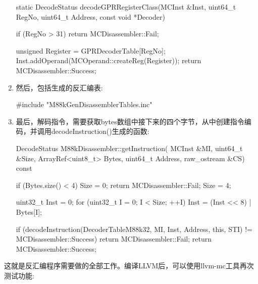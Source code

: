 \begin{enumerate}
\begin{cpp}
static DecodeStatus
decodeGPRRegisterClass(MCInst &Inst, uint64_t RegNo,
                        uint64_t Address,
                        const void *Decoder) {
    if (RegNo > 31)
        return MCDisassembler::Fail;

    unsigned Register = GPRDecoderTable[RegNo];
    Inst.addOperand(MCOperand::createReg(Register));
    return MCDisassembler::Success;
}
\end{cpp}

\item
然后，包括生成的反汇编表:

\begin{cpp}
#include "M88kGenDisassemblerTables.inc"
\end{cpp}

\item
最后，解码指令，需要获取bytes数组中接下来的四个字节，从中创建指令编码，并调用decodeInstruction()生成的函数:

\begin{cpp}
DecodeStatus M88kDisassembler::getInstruction(
        MCInst &MI, uint64_t &Size, ArrayRef<uint8_t> Bytes,
        uint64_t Address, raw_ostream &CS) const {
    if (Bytes.size() < 4) {
        Size = 0;
        return MCDisassembler::Fail;
    }
    Size = 4;

    uint32_t Inst = 0;
    for (uint32_t I = 0; I < Size; ++I)
        Inst = (Inst << 8) | Bytes[I];

    if (decodeInstruction(DecoderTableM88k32, MI, Inst,
                          Address, this, STI) !=
        MCDisassembler::Success) {
        return MCDisassembler::Fail;
    }
    return MCDisassembler::Success;
}
\end{cpp}

\end{enumerate}

这就是反汇编程序需要做的全部工作。编译LLVM后，可以使用llvm-mc工具再次测试功能:


